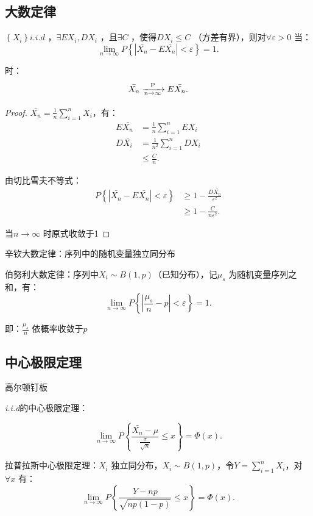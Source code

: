 \subsection{大数定律}%
\label{sub:大数定律}
\begin{defi}
    $\left\{ X_i \right\} i.i.d$ ，$\exists EX_i,DX_i$ ，且$\exists C$ ，使得$DX_i\le C$ （方差有界），则对$\forall \varepsilon>0$ 当：
    \[
        \lim_{n \to \infty} P\left\{ \left| \bar{X_n}-E\bar{X_n} \right| <\varepsilon \right\} =1
    .\] 

    时：
    \[
        \bar{X_n}\ce{->[P][n\to \infty ]}E\bar{X_n}
    .\] 
\end{defi}
\begin{proof}
    $\bar{X_n}=\displaystyle{\frac{1}{n} \sum_{i=1}^{n} X_i}$，有：
    \begin{align*}
        E\bar{X_n}&=\frac{1}{n} \sum_{i=1}^{n} EX_i\\
        D\bar{X_i}&=\frac{1}{n^2} \sum_{i=1}^{n} DX_i\\
                  &\le \frac{C}{n}
    .\end{align*}

    由切比雪夫不等式：
    \begin{align*}
        P\left\{ \left| \bar{X_n}-E\bar{X_n} \right| <\varepsilon \right\} &\ge 1-\frac{D\bar{X_n}}{\varepsilon^2}\\
                                                                        &\ge 1-\frac{C}{n\varepsilon^2}
    .\end{align*}

    当$n\to \infty $ 时原式收敛于1
\end{proof}
\begin{notation}
    辛钦大数定律：序列中的随机变量独立同分布
\end{notation}
\begin{notation}
    伯努利大数定律：序列中$X_i\sim B\left( 1,p \right) $（已知分布），记$\mu_s$ 为随机变量序列之和，有：
    \[
        \lim_{n \to \infty} P\left\{ \left| \frac{\mu_s}{n} -p  \right| <\varepsilon \right\} =1
    .\] 
    
    即：$\displaystyle{\frac{\mu_s}{n}} $ 依概率收敛于$p$
\end{notation}
\subsection{中心极限定理}%
\label{sub:中心极限定理}
\begin{eg}
    高尔顿钉板
\end{eg}
\begin{cor}
    \textit{i.i.d}的中心极限定理：

    \[
        \lim_{n \to \infty} P\left\{ \frac{\bar{X_n}-\mu}{\frac{\sigma}{\sqrt{n} } }\le x  \right\} =\Phi\left( x \right) 
    .\] 
\end{cor}
\begin{cor}
    拉普拉斯中心极限定理：$X_i$ 独立同分布，$X_i\sim B\left( 1,p \right) $，令$Y=\sum_{i=1}^{n} X_i$，对$\forall x$ 有：
    \[
        \lim_{n \to \infty} P\left\{ \frac{Y-np}{\sqrt{np\left( 1-p \right) } } \le x \right\} =\Phi\left( x \right) 
    .\]
\end{cor}
